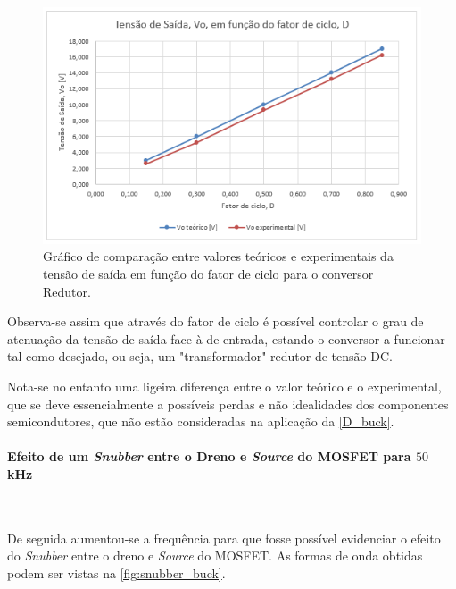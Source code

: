 \documentclass[a4paper,11pt]{article}
\numberwithin{equation}{section}
\begin{document}
\begin{figure}[H]
	\centering
	\includegraphics[keepaspectratio=true, scale=1.0]{teoricas/graf_buck}
	\caption{Gráfico de comparação entre valores teóricos e experimentais da tensão de saída em função do fator de ciclo para o conversor Redutor.}
	\label{fig:graf_buck}
	\vspace{-0.8em}
\end{figure}

Observa-se assim que através do fator de ciclo é possível controlar o grau de atenuação da tensão de saída face à de entrada, estando o conversor a funcionar tal como desejado, ou seja, um "transformador" redutor de tensão DC.

Nota-se no entanto uma ligeira diferença entre o valor teórico e o experimental, que se deve essencialmente a possíveis perdas e não idealidades dos componentes semicondutores, que não estão consideradas na aplicação da \autoref{D_buck}.

\paragraph{Efeito de um \textit{Snubber} entre o Dreno e \textit{Source} do MOSFET para $50$ kHz}\mbox{}\

De seguida aumentou-se a frequência para que fosse possível evidenciar o efeito do \textit{Snubber} entre o dreno e \textit{Source} do MOSFET. As formas de onda obtidas podem ser vistas na \autoref{fig:snubber_buck}.
\end{document}
